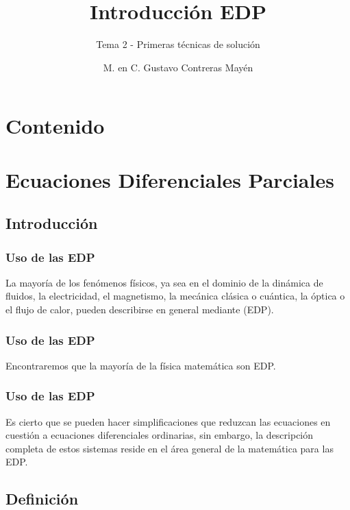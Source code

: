 \documentclass[12pt]{beamer}
\date{}
\title{\large{Introducción EDP }}
\subtitle{Tema 2 - Primeras técnicas de solución}
\author{M. en C. Gustavo Contreras Mayén}
\begin{document}
\maketitle
\fontsize{14}{14}\selectfont
{}

\section*{Contenido}

\section{Ecuaciones Diferenciales Parciales}
\subsection{Introducción}

\begin{frame}
\frametitle{Uso de las EDP}
La mayoría de los fenómenos físicos, ya sea en el dominio de la dinámica de fluidos, la electricidad, el magnetismo, la mecánica clásica o cuántica, la óptica o el flujo de calor, pueden describirse en general mediante  (EDP).
\end{frame}
\begin{frame}
\frametitle{Uso de las EDP}
Encontraremos que la mayoría de la física matemática son EDP. 
\end{frame}
\begin{frame}
\frametitle{Uso de las EDP}
Es cierto que se pueden hacer simplificaciones que reduzcan las ecuaciones en cuestión a ecuaciones diferenciales ordinarias, sin embargo, la descripción completa de estos sistemas reside en el área general de la matemática para las EDP.
\end{frame}

\subsection{Definición}
\end{document}
